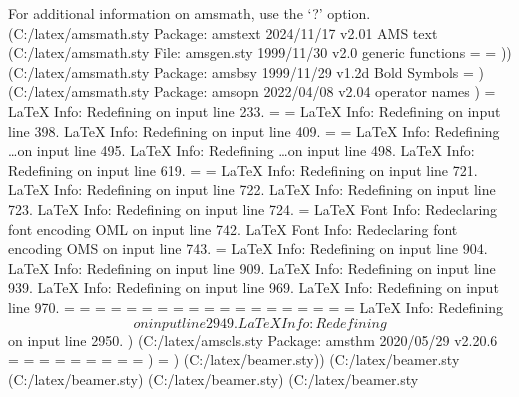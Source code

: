 For additional information on amsmath, use the `?' option.
(C:\Users\SEARS\AppData\Local\Programs\MiKTeX\tex/latex/amsmath\amstext.sty
Package: amstext 2024/11/17 v2.01 AMS text
 (C:\Users\SEARS\AppData\Local\Programs\MiKTeX\tex/latex/amsmath\amsgen.sty
File: amsgen.sty 1999/11/30 v2.0 generic functions
\@emptytoks=
\ex@=
)) (C:\Users\SEARS\AppData\Local\Programs\MiKTeX\tex/latex/amsmath\amsbsy.sty
Package: amsbsy 1999/11/29 v1.2d Bold Symbols
\pmbraise@=
) (C:\Users\SEARS\AppData\Local\Programs\MiKTeX\tex/latex/amsmath\amsopn.sty
Package: amsopn 2022/04/08 v2.04 operator names
)
\inf@bad=
LaTeX Info: Redefining \frac on input line 233.
\uproot@=
\leftroot@=
LaTeX Info: Redefining \overline on input line 398.
LaTeX Info: Redefining \colon on input line 409.
\classnum@=
\DOTSCASE@=
LaTeX Info: Redefining \ldots on input line 495.
LaTeX Info: Redefining \dots on input line 498.
LaTeX Info: Redefining \cdots on input line 619.
\Mathstrutbox@=
\strutbox@=
LaTeX Info: Redefining \big on input line 721.
LaTeX Info: Redefining \Big on input line 722.
LaTeX Info: Redefining \bigg on input line 723.
LaTeX Info: Redefining \Bigg on input line 724.
\big@size=
LaTeX Font Info:    Redeclaring font encoding OML on input line 742.
LaTeX Font Info:    Redeclaring font encoding OMS on input line 743.
\macc@depth=
LaTeX Info: Redefining \bmod on input line 904.
LaTeX Info: Redefining \pmod on input line 909.
LaTeX Info: Redefining \smash on input line 939.
LaTeX Info: Redefining \relbar on input line 969.
LaTeX Info: Redefining \Relbar on input line 970.
\c@MaxMatrixCols=
\dotsspace@=
\c@parentequation=
\dspbrk@lvl=
\tag@help=
\row@=
\column@=
\maxfields@=
\andhelp@=
\eqnshift@=
\alignsep@=
\tagshift@=
\tagwidth@=
\totwidth@=
\lineht@=
\@envbody=
\multlinegap=
\multlinetaggap=
\mathdisplay@stack=
LaTeX Info: Redefining \[ on input line 2949.
LaTeX Info: Redefining \] on input line 2950.
) (C:\Users\SEARS\AppData\Local\Programs\MiKTeX\tex/latex/amscls\amsthm.sty
Package: amsthm 2020/05/29 v2.20.6
\thm@style=
\thm@bodyfont=
\thm@headfont=
\thm@notefont=
\thm@headpunct=
\thm@preskip=
\thm@postskip=
\thm@headsep=
\dth@everypar=
)
\c@theorem=
) (C:\Users\SEARS\AppData\Local\Programs\MiKTeX\tex/latex/beamer\beamerbasethemes.sty)) (C:\Users\SEARS\AppData\Local\Programs\MiKTeX\tex/latex/beamer\beamerthemedefault.sty (C:\Users\SEARS\AppData\Local\Programs\MiKTeX\tex/latex/beamer\beamerfontthemedefault.sty) (C:\Users\SEARS\AppData\Local\Programs\MiKTeX\tex/latex/beamer\beamercolorthemedefault.sty) (C:\Users\SEARS\AppData\Local\Programs\MiKTeX\tex/latex/beamer\beamerinnerthemedefault.sty
